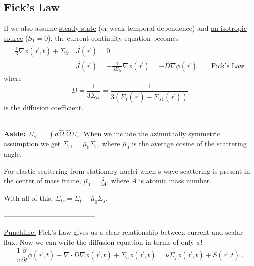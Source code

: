 \documentclass[12pt]{article}
\newlength{\up}
\newcommand{\Macro}{\ensuremath{\Sigma}}
\newcommand{\vOmega}{\ensuremath{\hat{\Omega}}}
\begin{document}
\subsection*{Fick's Law}
If we also assume \underline{steady state} (or weak temporal dependence) and \underline{an isotropic source} ($S_1 = 0$), the current continuity equation becomes
%
\begin{align*}
\frac{1}{3} \nabla \phi(\vec{r}, t) +
\Sigma_{tr}  &\vec{J}(\vec{r}) = 0 \\
&\boxed{\vec{J}(\vec{r}) = -\frac{1}{3\Sigma_{tr}} \nabla \phi(\vec{r}) = -D\nabla \phi(\vec{r}) } \qquad \text{Fick's Law}
\end{align*}
%
where
\[D = \frac{1}{3\Macro_{tr}} = \frac{1}{3(\Macro_t(\vec{r}) - \Macro_{s1}(\vec{r}))}\] 
is the diffusion coefficient. 

 ---------------------------------------\\
\textbf{Aside:} $\Macro_{s1}  = \int d\vOmega \:\vOmega \Macro_{s}$. When we include the azimuthally symmetric assumption we get $\Macro_{s1} = \bar{\mu}_{0}\Macro_{s}$, where $\bar{\mu}_{0}$ is the average cosine of the scattering angle.

For elastic scattering from stationary nuclei when s-wave scattering is present in the center of mass frame, $\bar{\mu_{0}} = \frac{2}{3A}$, where $A$ is atomic mass number. 

With all of this, $\Sigma_{tr} = \Sigma_t - \bar{\mu}_0 \Sigma_s$.

%
 ---------------------------------------

\underline{Punchline:} Fick's Law gives us a clear relationship between current and scalar flux. Now we can write the diffusion equation in terms of only $\phi$!
%
\begin{equation}
\boxed{\frac{1}{v}\frac{\partial}{\partial t}\phi(\vec{r}, t) 
-\nabla \cdot D\nabla \phi(\vec{r}, t) + 
\Sigma_a \phi(\vec{r}, t) =
\nu \Sigma_f \phi(\vec{r}, t) +
S(\vec{r}, t)} \:. \nonumber
\end{equation}
\end{document}
